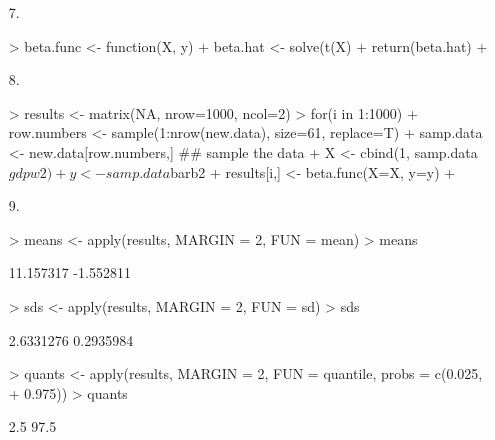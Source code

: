 \documentclass[handout]{beamer}
\newcommand{\red}{\color{red}}
\begin{document}
\begin{frame}[fragile]
\begin{enumerate}
\red
\footnotesize
\item[7.]
\begin{Schunk}
\begin{Sinput}
> beta.func <- function(X, y) {
+     beta.hat <- solve(t(X) %
+     return(beta.hat)
+ }
\end{Sinput}
\end{Schunk}
\item[8.]
\begin{Schunk}
\begin{Sinput}
> results <- matrix(NA, nrow=1000, ncol=2)
> for(i in 1:1000){
+   row.numbers <- sample(1:nrow(new.data), size=61, replace=T)
+   samp.data <- new.data[row.numbers,]  ## sample the data
+   X <- cbind(1, samp.data$gdpw2)
+   y <- samp.data$barb2
+   results[i,] <- beta.func(X=X, y=y)
+ }
\end{Sinput}
\end{Schunk}
\end{enumerate}
\end{frame}

\begin{frame}[fragile]
\begin{enumerate}
\red
\footnotesize
\item[9.]
\begin{Schunk}
\begin{Sinput}
> means <- apply(results, MARGIN = 2, FUN = mean)
> means
\end{Sinput}
\begin{Soutput}
[1] 11.157317 -1.552811
\end{Soutput}
\begin{Sinput}
> sds <- apply(results, MARGIN = 2, FUN = sd)
> sds
\end{Sinput}
\begin{Soutput}
[1] 2.6331276 0.2935984
\end{Soutput}
\begin{Sinput}
> quants <- apply(results, MARGIN = 2, FUN = quantile, probs = c(0.025, 
+     0.975))
> quants
\end{Sinput}
\begin{Soutput}
           [,1]       [,2]
2.5%
97.5%
\end{Soutput}
\end{Schunk}
\end{enumerate}
\end{frame}
\end{document}
